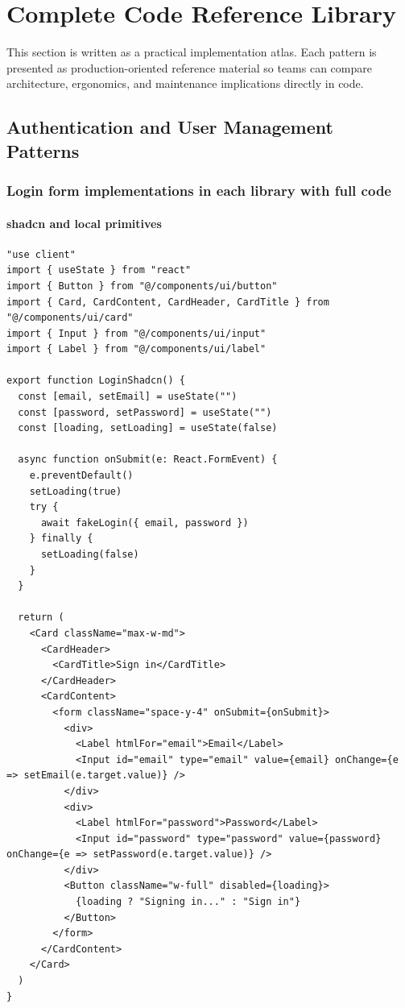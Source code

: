 \clearpage
\section{Complete Code Reference Library}

This section is written as a practical implementation atlas. Each pattern is presented as production-oriented reference material so teams can compare architecture, ergonomics, and maintenance implications directly in code.

\subsection{Authentication and User Management Patterns}

\subsubsection{Login form implementations in each library with full code}

\paragraph{shadcn and local primitives}
\begin{verbatim}
"use client"
import { useState } from "react"
import { Button } from "@/components/ui/button"
import { Card, CardContent, CardHeader, CardTitle } from "@/components/ui/card"
import { Input } from "@/components/ui/input"
import { Label } from "@/components/ui/label"

export function LoginShadcn() {
  const [email, setEmail] = useState("")
  const [password, setPassword] = useState("")
  const [loading, setLoading] = useState(false)

  async function onSubmit(e: React.FormEvent) {
    e.preventDefault()
    setLoading(true)
    try {
      await fakeLogin({ email, password })
    } finally {
      setLoading(false)
    }
  }

  return (
    <Card className="max-w-md">
      <CardHeader>
        <CardTitle>Sign in</CardTitle>
      </CardHeader>
      <CardContent>
        <form className="space-y-4" onSubmit={onSubmit}>
          <div>
            <Label htmlFor="email">Email</Label>
            <Input id="email" type="email" value={email} onChange={e => setEmail(e.target.value)} />
          </div>
          <div>
            <Label htmlFor="password">Password</Label>
            <Input id="password" type="password" value={password} onChange={e => setPassword(e.target.value)} />
          </div>
          <Button className="w-full" disabled={loading}>
            {loading ? "Signing in..." : "Sign in"}
          </Button>
        </form>
      </CardContent>
    </Card>
  )
}
\end{verbatim}


